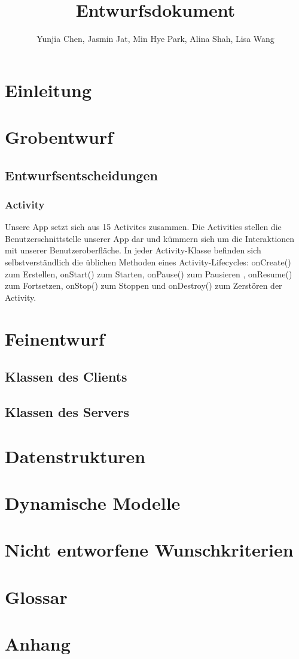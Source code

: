 \documentclass[a4paper]{scrreprt}
\title{Entwurfsdokument}
\author{Yunjia Chen, Jasmin Jat, Min Hye Park, Alina Shah, Lisa Wang}
\begin{document}
\maketitle
\tableofcontents 
\newpage
\chapter{Einleitung}

\chapter{Grobentwurf}
	\section{Entwurfsentscheidungen}
    	\subsection{Activity}
        Unsere App setzt sich aus 15 Activites zusammen. Die Activities stellen die Benutzerschnittstelle unserer App dar und kümmern sich um die Interaktionen mit unserer Benutzeroberfläche. In jeder Activity-Klasse befinden sich selbstverständlich die üblichen Methoden eines Activity-Lifecycles: onCreate() zum Erstellen, onStart() zum Starten, onPause() zum Pausieren , onResume() zum Fortsetzen, onStop() zum Stoppen und onDestroy() zum Zerstören der Activity.
        
        
\newpage

\chapter{Feinentwurf}
	\section{Klassen des Clients}
	
	

	\section{Klassen des Servers}
	
 

\chapter{Datenstrukturen}

\chapter{Dynamische Modelle}

\chapter{Nicht entworfene Wunschkriterien}

\chapter{Glossar}

\chapter{Anhang}
\end{document}
